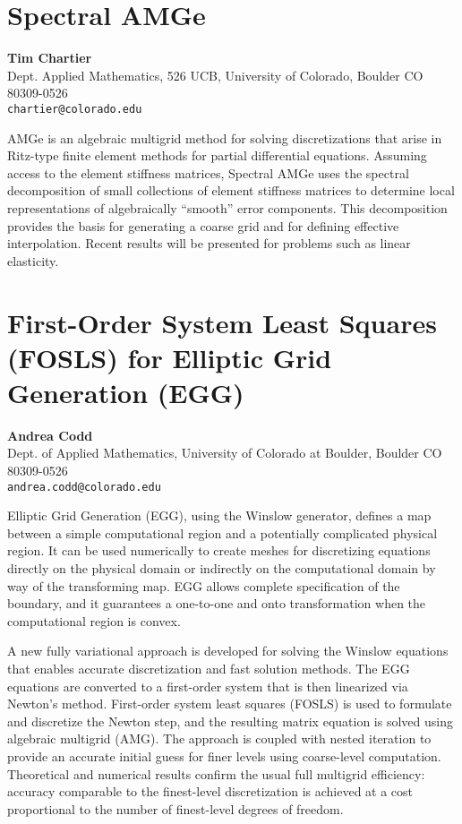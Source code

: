 \documentclass[11pt]{article}
\newcommand{\nextab}[4]{
	\section{#2}
	{\bf #1} \\ \nopagebreak
	{#3} \\ \nopagebreak
	{\tt #4} \nopagebreak
	}
\begin{document}

\nextab
{Tim Chartier}
{Spectral AMGe}
{Dept. Applied Mathematics, 526 UCB, University of Colorado, Boulder CO 80309-0526}
{chartier@colorado.edu}


AMGe is an algebraic multigrid method for solving discretizations that
arise in Ritz-type finite element methods for partial differential
equations.  Assuming access to the element stiffness matrices, Spectral
AMGe uses the spectral decomposition of small collections of element
stiffness matrices to determine local representations of algebraically
``smooth'' error components.  This decomposition provides the basis for
generating a coarse grid and for defining effective interpolation.  Recent
results will be presented for problems such as linear elasticity.






\nextab
{Andrea Codd}
{First-Order System Least Squares (FOSLS) for Elliptic Grid Generation (EGG)}
{Dept. of Applied Mathematics, University of Colorado at Boulder, Boulder CO 80309-0526}
{andrea.codd@colorado.edu}


Elliptic Grid Generation (EGG), using the Winslow generator, defines a map
between a simple computational region and a potentially complicated
physical region. It can be used numerically to create meshes for
discretizing equations directly on the physical domain or indirectly on
the computational domain by way of the transforming map. EGG allows
complete specification of the boundary, and it guarantees a one-to-one and
onto transformation when the computational region is convex.

A new fully variational approach is developed for solving the Winslow
equations that enables accurate discretization and fast solution methods.
The EGG equations are converted to a first-order system that is then
linearized via Newton's method. First-order system least squares (FOSLS)
is used to formulate and discretize the Newton step, and the resulting
matrix equation is solved using algebraic multigrid (AMG). The approach is
coupled with nested iteration to provide an accurate initial guess for
finer levels using coarse-level computation. Theoretical and numerical
results confirm the usual full multigrid efficiency: accuracy comparable
to the finest-level discretization is achieved at a cost proportional to
the number of finest-level degrees of freedom.
\end{document}
